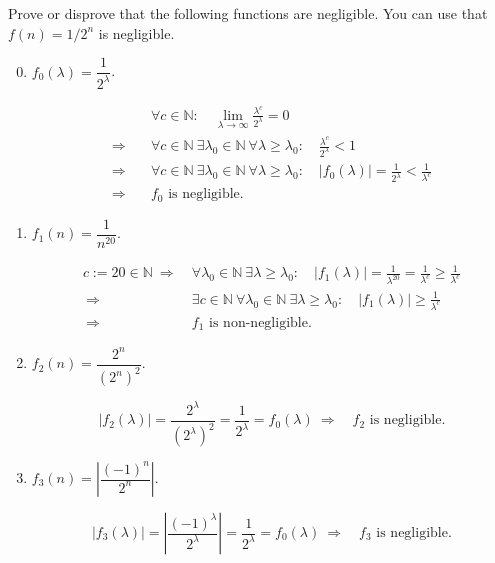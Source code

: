 \documentclass[12pt,a4paper]{article}
\begin{document}
\begin{problem}
Prove or disprove that the following functions are negligible.
You can use that $f(n)=1/2^n$ is negligible.
\begin{enumerate}
\setcounter{enumi}{-1}
\item $f_0(\lambda)=\dfrac{1}{2^\lambda}$.
\begin{solution}
\[
\begin{aligned}
&\forall c\in\mathbb{N}:\quad
\lim_{\lambda\to\infty}\frac{\lambda^c}{2^\lambda}=0\\
\Longrightarrow\quad
&\forall c\in\mathbb{N}\ \exists\lambda_0\in\mathbb{N}\
\forall\lambda\ge\lambda_0:
\quad\frac{\lambda^c}{2^\lambda}<1\\
\Longrightarrow\quad
&\forall c\in\mathbb{N}\ \exists\lambda_0\in\mathbb{N}\
\forall\lambda\ge\lambda_0:
\quad |f_0(\lambda)|=\frac{1}{2^\lambda}<\frac{1}{\lambda^c}\\
\Longrightarrow\quad
&f_0\text{ is negligible}.
\end{aligned}
\]
\end{solution}
\item $f_1(n)=\dfrac{1}{n^{20}}$.
\begin{solution}
\[
\begin{aligned}
c:=20\in\mathbb{N}
\ \Longrightarrow\
&\forall\lambda_0\in\mathbb{N}\ \exists\lambda\ge\lambda_0:
\quad |f_1(\lambda)|=\frac{1}{\lambda^{20}}
=\frac{1}{\lambda^c}\ge\frac{1}{\lambda^c}\\
\ \Longrightarrow\
&\exists c\in\mathbb{N}\ \forall\lambda_0\in\mathbb{N}\
\exists\lambda\ge\lambda_0:
\quad |f_1(\lambda)|\ge\frac{1}{\lambda^c}\\
\ \Longrightarrow\
&f_1\text{ is non-negligible}.
\end{aligned}
\]
\end{solution}
\item $f_2(n)=\dfrac{2^n}{(2^n)^2}$.
\begin{solution}
\[
|f_2(\lambda)|
=\frac{2^\lambda}{(2^\lambda)^2}
=\frac{1}{2^\lambda}
=f_0(\lambda)
\ \Longrightarrow\quad f_2\text{ is negligible}.
\]
\end{solution}
\item $f_3(n)=\left|\dfrac{(-1)^n}{2^n}\right|$.
\begin{solution}
\[
|f_3(\lambda)|
=\left|\frac{(-1)^\lambda}{2^\lambda}\right|
=\frac{1}{2^\lambda}
=f_0(\lambda)
\ \Longrightarrow\quad f_3\text{ is negligible}.
\]
\end{solution}

\end{enumerate}
\end{problem}
\end{document}
